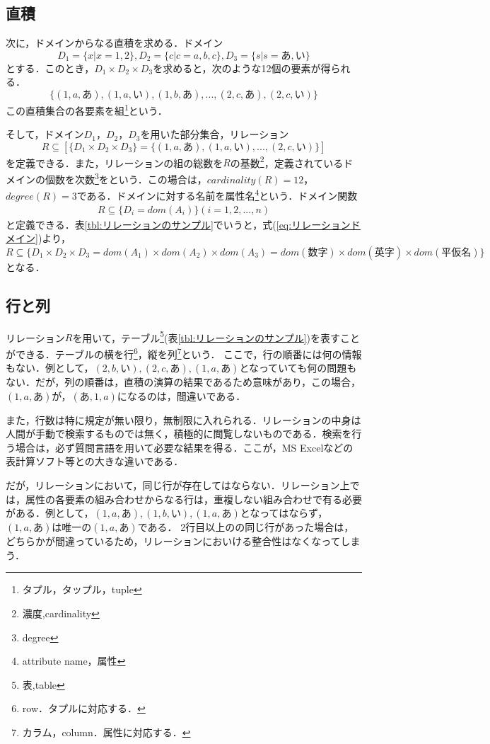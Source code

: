 \documentclass[a4paper,10pt]{jreport}
\begin{document}
\subsection{直積}
\par 次に，ドメインからなる直積を求める．ドメイン
\begin{equation}
	D_1=\{x|x=1,2\},D_2=\{c|c=a,b,c\},D_3=\{s|s=あ,い\}
\end{equation}
	とする．このとき，$D_1 \times D_2 \times D_3$を求めると，次のような12個の要素が得られる．
\begin{equation}
	\{(1,a,あ),(1,a,い),(1,b,あ),...,(2,c,あ),(2,c,い)\}
\end{equation}
この直積集合の各要素を組\footnote{タプル，タップル，tuple}という．
\par そして，ドメイン$D_1$，$D_2$，$D_3$を用いた部分集合，リレーション
\begin{equation}
	R \subseteq [\{D_1 \times D_2 \times D_3\}=\{(1,a,あ),(1,a,い),...,(2,c,い)\}] \label{eq:リレーションドメイン}
\end{equation}
を定義できる．また，リレーションの組の総数を$R$の基数\footnote{濃度,cardinality}，定義されているドメインの個数を次数\footnote{degree}をという．この場合は，$cardinality(R)=12$，$degree(R)=3$である．ドメインに対する名前を属性名\footnote{attribute name，属性}という．ドメイン関数
\begin{eqnarray}
	R \subseteq \{D_i=dom(A_i)\} (i=1,2,...,n)
\end{eqnarray}
と定義できる．表\ref{tbl:リレーションのサンプル}でいうと，式(\ref{eq:リレーションドメイン})より，
\begin{equation}
	R \subseteq \{D_1 \times D_2 \times D_3 = dom(A_1) \times dom(A_2) \times dom(A_3) = dom(数字) \times dom(英字) \times dom(平仮名) \}
\end{equation}
となる．

\subsection{行と列}
リレーション$R$を用いて，テーブル\footnote{表,table}(表\ref{tbl:リレーションのサンプル})を表すことができる．テーブルの横を行\footnote{row．タプルに対応する．}，縦を列\footnote{カラム，column．属性に対応する．}という．
ここで，行の順番には何の情報もない．例として，$(2,b,い),(2,c,あ),(1,a,あ)$となっていても何の問題もない．だが，列の順番は，直積の演算の結果であるため意味があり，この場合，$(1,a,あ)$が，$(あ,1,a)$になるのは，間違いである．
\par また，行数は特に規定が無い限り，無制限に入れられる．リレーションの中身は人間が手動で検索するものでは無く，積極的に閲覧しないものである．検索を行う場合は，必ず質問言語を用いて必要な結果を得る．ここが，MS Excelなどの表計算ソフト等との大きな違いである．
\par だが，リレーションにおいて，同じ行が存在してはならない．リレーション上では，属性の各要素の組み合わせからなる行は，重複しない組み合わせで有る必要がある．例として，$(1,a,あ),(1,b,い),(1,a,あ)$となってはならず，$(1,a,あ)$は唯一の$(1,a,あ)$である．
2行目以上のの同じ行があった場合は，どちらかが間違っているため，リレーションにおいける整合性はなくなってしまう．
\end{document}
